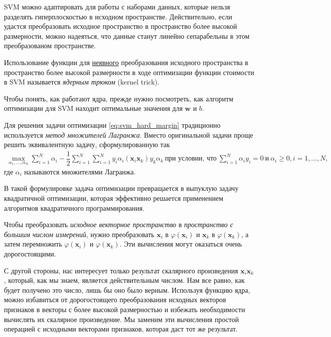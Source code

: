 \documentclass[%
	11pt,
	a4paper,
	utf8,
		]{article}
\begin{document}
SVM можно адаптировать для работы с наборами данных, которые нельзя разделять гиперплоскостью в исходном пространстве. Действительно, если удастся преобразовать исходное пространство в пространство более высокой размерности, можно надеяться, что данные станут линейно сепарабельны в этом преобразованом пространстве.

Использование функции для \underline{неявного} преобразования исходного пространства в пространство более высокой размерности в ходе оптимизации функции стоимости в SVM называется \emph{ядерным трюком} (kernel trick).

Чтобы понять, как работают ядра, прежде нужно посмотреть, как алгоритм оптимизации для SVM находит оптимальные значения для $ \mathbf{w} $ и $ b $.

Для решения задачи оптимизации \eqref{eq:svm_hard_margin} традиционно используется \emph{метод множителей Лагранжа}. Вместо оригинальной задачи проще решить эквивалентную задачу, сформулированную так
\begin{align*}
	\max_{ \alpha_1, \ldots, \alpha_N } \sum_{i=1}^N \alpha_i - \dfrac{1}{2} \sum_{i=1}^{N} \sum_{i=1}^N y_i \alpha_i (\mathbf{x}_i \mathbf{x}_k) y_k \alpha_k\ \text{при условии, что} \ \sum_{i=1}^N \alpha_i y_i = 0\ \text{и} \ \alpha_i \geqslant 0, i = 1, \ldots, N,
\end{align*}
где $ \alpha_i $ называются множителями Лагранжа.

В такой формулировке задача оптимизации превращается в выпуклую задачу квадратичной оптимизации, которая эффективно решается применением алгоритмов квадратичного программирования.

Чтобы преобразовать \emph{исходное векторное пространство} в \emph{пространство с большим числом измерений}, нужно преобразовать $ \mathbf{x}_i $ в $ \varphi( \mathbf{x}_i ) $ и $ \mathbf{x}_k $ в $ \varphi( \mathbf{x}_k ) $, а затем перемножить $ \varphi( \mathbf{x}_i ) $ и $ \varphi( \mathbf{x}_k ) $. Эти вычисления могут оказаться очень дорогостоящими.

С другой стороны, нас интересует только результат скалярного произведения $ \mathbf{x}_i \mathbf{x}_k $, который, как мы знаем, является действительным числом. Нам все равно, как будет получено это число, лишь бы оно было верным. Используя функцию ядра, можно избавиться от дорогостоящего преобразования исходных векторов признаков в векторы с более высокой размерностью и избежать необходимости вычислять их скалярное произведение. Мы заменим эти вычисления простой операцией с исходными векторами признаков, которая даст тот же результат.
\end{document}
